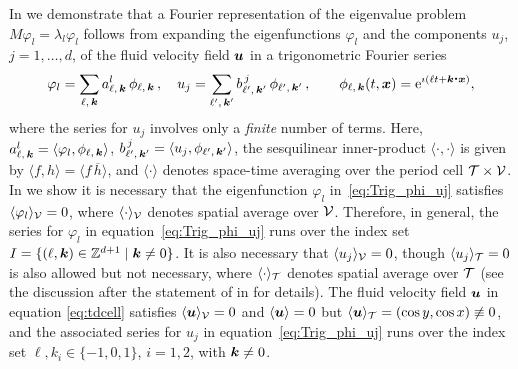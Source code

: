 \documentclass[amsa]{ipart}
\begin{document}
In  we demonstrate that a Fourier 
representation of the eigenvalue problem $M\varphi_l=\lambda_l\varphi_l$ follows from
expanding the eigenfunctions $\varphi_l$ and the components $u_j$,
$j=1,\ldots,d$, of the fluid velocity field $\boldsymbol{u}$ in a trigonometric
Fourier series   
%
\begin{align}\label{eq:Trig_phi_uj}
  \varphi_l=\sum_{\ell,\,\veck}a^l_{\ell,\,\veck}\,\phi_{\ell,\,\veck}\,,
  \quad
  u_j=\sum_{\ell^\prime,\,\veck^\prime}b^{\,j}_{\ell^\prime,\,\veck^\prime}\,\phi_{\ell^\prime,\,\veck^\prime}\,,
  \qquad
  \phi_{\ell,\,\veck}(t,\vecx)=\e^{\imath(\ell t+\veck\bcdot\vecx)},
\end{align}
%
where the series for $u_j$ involves only a \emph{finite} number of
terms. Here, $a^l_{\ell,\,\boldsymbol{k}}=\langle\varphi_l,\phi_{\ell,\,\boldsymbol{k}}\rangle$,
$b^{\,j}_{\ell^\prime,\,\boldsymbol{k}^\prime}=\langle u_j,\phi_{\ell^\prime,\,\boldsymbol{k}^\prime}\rangle$,
the
sesquilinear inner-product $\langle\cdot,\cdot\rangle$ is given by $\langle f,h\rangle=\langle
f\,\overline{h}\rangle$, and $\langle\cdot\rangle$ denotes space-time averaging over the period
cell $\mathcal{T}\times\mathcal{V}$. In  we show it is necessary
that the eigenfunction $\varphi_l$ in~\eqref{eq:Trig_phi_uj} satisfies
$\langle\varphi_l\rangle_{\mathcal{V}}=0$, where $\langle\cdot\rangle_{\mathcal{V}}$ denotes spatial average over
$\mathcal{V}$. Therefore, in general, the series for $\varphi_l$ in 
equation~\eqref{eq:Trig_phi_uj} runs over the index set
$I=\{(\ell,\boldsymbol{k})\in\mathbb{Z}^{d+1} \;|\; \boldsymbol{k}\neq0\}$. It 
is also necessary that $\langle u_j\rangle_{\mathcal{V}}=0$, though $\langle u_j\rangle_{\mathcal{T}}=0$ is
also allowed but not necessary, where $\langle\cdot\rangle_{\mathcal{T}}$ denotes spatial
average over $\mathcal{T}$ (see the discussion after the statement of 
 in  for
details). The fluid velocity field $\boldsymbol{u}$ in equation
\eqref{eq:tdcell} satisfies $\langle\boldsymbol{u}\rangle_{\mathcal{V}}=0$ and $\langle\boldsymbol{u}\rangle=0$ but
$\langle\boldsymbol{u}\rangle_{\mathcal{T}}=(\cos{y},\cos{x})\not\equiv0$, and the associated series for
$u_j$ in equation~\eqref{eq:Trig_phi_uj} runs over the index set
$\ell,k_i\in\{-1,0,1\}$, $i=1,2$, with $\boldsymbol{k}\neq0$.
\end{document}
